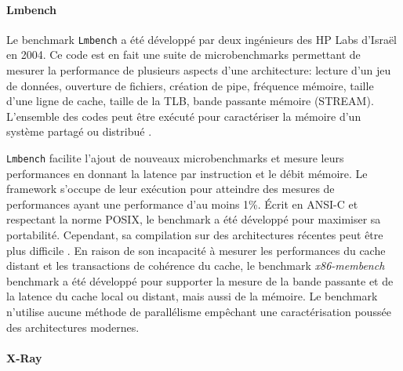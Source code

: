        
        \paragraph{Lmbench \cite{Staelin2004}} 
            
            
            Le benchmark \verb|Lmbench| \cite{Staelin2004} a été développé par deux ingénieurs des HP Labs d'Israël en 2004. Ce code est en fait une suite de microbenchmarks permettant de mesurer la performance de plusieurs aspects d'une architecture: lecture d'un jeu de données, ouverture de fichiers, création de pipe, fréquence mémoire, taille d'une ligne de cache, taille de la TLB, bande passante mémoire (STREAM). L'ensemble des codes peut être exécuté pour caractériser la mémoire d'un système partagé ou distribué \cite{Staelin2002}.
            
            \verb|Lmbench| facilite l'ajout de nouveaux microbenchmarks et mesure leurs performances en donnant la latence par instruction et le débit mémoire. Le framework s'occupe de leur exécution pour atteindre des mesures de performances ayant une performance d'au moins 1\%. Écrit en ANSI-C et respectant la norme POSIX, le benchmark a été développé pour maximiser sa portabilité. Cependant, sa compilation sur des architectures récentes peut être plus difficile \cite{Yotov2004}. En raison de son incapacité à mesurer les performances du cache distant et les transactions de cohérence du cache, le benchmark \textit{x86-membench} benchmark \cite{Molka2017} a été développé pour supporter la mesure de la bande passante et de la latence du cache local ou distant, mais aussi de la mémoire. Le benchmark n'utilise aucune méthode de parallélisme empêchant une caractérisation poussée des architectures modernes. 

        \paragraph{X-Ray \cite{Yotov2004}} 
        
